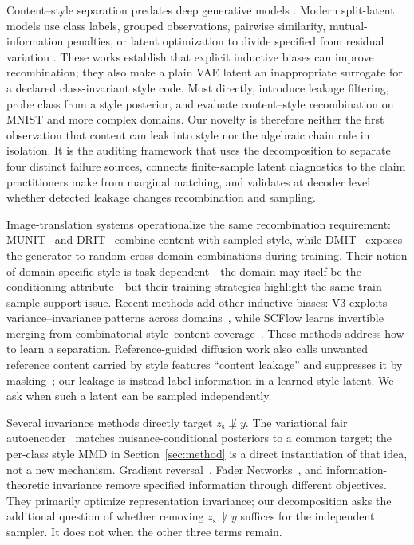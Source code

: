 \documentclass[letterpaper]{article}
\newcommand{\zs}{z_{\mathrm{s}}}
\begin{document}
Content--style separation predates deep generative models
\citep{tenenbaum2000separating}. Modern split-latent models use class labels,
grouped observations, pairwise similarity, mutual-information penalties, or
latent optimization to divide specified from residual variation
\citep{mathieu2016disentangling,bouchacourt2018multilevel,jha2018cycle,klys2018subspaces,zheng2019label,ilse2020diva,gabbay2020lord}.
These works establish that explicit inductive biases can improve
recombination; they also make a plain VAE latent an inappropriate surrogate
for a declared class-invariant style code. Most directly,
\citet{ridgeway2018leakage} introduce leakage filtering, probe class from a
style posterior, and evaluate content--style recombination on MNIST and more
complex domains. Our novelty is therefore neither the first observation that
content can leak into style nor the algebraic chain rule in isolation. It is
the auditing framework that uses the decomposition to separate four distinct
failure sources, connects finite-sample latent diagnostics to the claim
practitioners make from marginal matching, and validates at decoder level
whether detected leakage changes recombination and sampling.

Image-translation systems operationalize the same recombination requirement:
MUNIT~\citep{huang2018munit} and DRIT~\citep{lee2018drit} combine content with
sampled style, while DMIT~\citep{yu2019dmit} exposes the generator to random
cross-domain combinations during training. Their notion of domain-specific
style is task-dependent---the domain may itself be the conditioning
attribute---but their training strategies highlight the same train--sample
support issue. Recent methods add other inductive biases: V3 exploits
variance--invariance patterns across domains~\citep{wu2025variance}, while
SCFlow learns invertible merging from combinatorial style--content
coverage~\citep{ma2025scflow}. These methods address how to learn a
separation. Reference-guided diffusion work also calls unwanted reference
content carried by style features ``content leakage'' and suppresses it by
masking~\citep{zhu2025less}; our leakage is instead label information in a
learned style latent. We ask when such a latent can be sampled independently.

Several invariance methods directly target $\zs\not\perp y$. The variational
fair autoencoder~\citep{louizos2015variational} matches nuisance-conditional
posteriors to a common target; the per-class style MMD in
Section~\ref{sec:method} is a direct instantiation of that idea, not a new
mechanism. Gradient reversal~\citep{ganin2015unsupervised}, Fader
Networks~\citep{lample2017fader}, and information-theoretic invariance
\citep{moyer2018invariant} remove specified information through different
objectives. They primarily optimize representation invariance; our
decomposition asks the additional question of whether removing
$\zs\not\perp y$ suffices for the independent sampler. It does not when the
other three terms remain.
\end{document}
